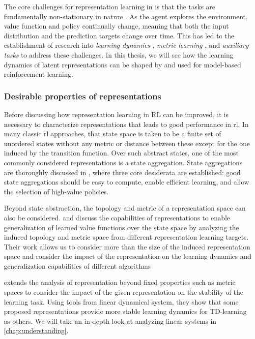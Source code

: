 The core challenges for representation learning in  is that the tasks are fundamentally non-stationary in nature \parencite{kumar2021implicit,nikishin2022primacy}.
As the agent explores the environment, value function and policy continually change, meaning that both the input distribution and the prediction targets change over time.
This has led to the establishment of research into \emph{learning dynamics} \parencite{lyle2022learning,lyle2022understanding}, \emph{metric learning} \parencite{ferns2011bisimulation,barreto2017successor,borsa2018universal,le2021metrics}, and \emph{auxiliary tasks} \parencite{jaderberg2017reinforcement,bellemare2019geometric,lyle2021effect,farebrother2023protovalue} to address these challenges.
In this thesis, we will see how the learning dynamics of latent representations can be shaped by and used for model-based reinforcement learning.

\subsubsection{Desirable properties of representations}

Before discussing how representation learning in RL can be improved, it is necessary to characterize representations that leads to good performance in \ac{rl}.
In many classic \ac{rl} approaches, that state space is taken to be a finite set of unordered states without any metric or distance between these except for the one induced by the transition function.
Over such abstract states, one of the most commonly considered representations is a state aggregation.
State aggregations are thoroughly discussed in \textcite{abel2020thesis}, where three core desiderata are established: good state aggregations should be easy to compute, enable efficient learning, and allow the selection of high-value policies.

Beyond state abstraction, the topology and metric of a representation space can also be considered. 
\textcite{le2021metrics} and \textcite{lelan2022generalization} discuss the capabilities of representations to enable generalization of learned value functions over the state space by analyzing the induced topology and metric space from different representation learning targets.
Their work allows us to consider more than the size of the induced representation space and consider the impact of the representation on the learning dynamics and generalization capabilities of different algorithms

\textcite{ghosh2020representations} extends the analysis of representation beyond fixed properties such as metric spaces to consider the impact of the given representation on the stability of the learning task.
Using tools from linear dynamical system, they show that some proposed representations provide more stable learning dynamics for TD-learning as others.
We will take an in-depth look at analyzing linear systems in \autoref{chap:understanding}.

